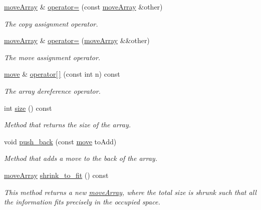 \begin{DoxyCompactItemize}
\mbox{\label{structmoveArray_ad7c5f1a65aab09aebbd565bb9cb4e75a}} 
\hyperlink{structmoveArray}{move\+Array} \& \hyperlink{structmoveArray_ad7c5f1a65aab09aebbd565bb9cb4e75a}{operator=} (const \hyperlink{structmoveArray}{move\+Array} \&other)
\begin{DoxyCompactList}\small\item\em The copy assignment operator. \end{DoxyCompactList}\item 
\mbox{\label{structmoveArray_ac52807be18bc0ed75496b11cedacb95c}} 
\hyperlink{structmoveArray}{move\+Array} \& \hyperlink{structmoveArray_ac52807be18bc0ed75496b11cedacb95c}{operator=} (\hyperlink{structmoveArray}{move\+Array} \&\&other)
\begin{DoxyCompactList}\small\item\em The move assignment operator. \end{DoxyCompactList}\item 
\mbox{\label{structmoveArray_a87f555217ae65d2cb0c3c86ea24685ba}} 
\hyperlink{structmove}{move} \& \hyperlink{structmoveArray_a87f555217ae65d2cb0c3c86ea24685ba}{operator\mbox{[}$\,$\mbox{]}} (const int n) const
\begin{DoxyCompactList}\small\item\em The array dereference operator. \end{DoxyCompactList}\item 
\mbox{\label{structmoveArray_a51d7076907d805b0ba70a70f73e3bf65}} 
int \hyperlink{structmoveArray_a51d7076907d805b0ba70a70f73e3bf65}{size} () const
\begin{DoxyCompactList}\small\item\em Method that returns the size of the array. \end{DoxyCompactList}\item 
\mbox{\label{structmoveArray_affee3c505faa6dc63cede89334cbfc7d}} 
void \hyperlink{structmoveArray_affee3c505faa6dc63cede89334cbfc7d}{push\+\_\+back} (const \hyperlink{structmove}{move} to\+Add)
\begin{DoxyCompactList}\small\item\em Method that adds a move to the back of the array. \end{DoxyCompactList}\item 
\mbox{\label{structmoveArray_a59c451aaecc1fddf97a92b886cf170f3}} 
\hyperlink{structmoveArray}{move\+Array} \hyperlink{structmoveArray_a59c451aaecc1fddf97a92b886cf170f3}{shrink\+\_\+to\+\_\+fit} () const
\begin{DoxyCompactList}\small\item\em This method returns a new \hyperlink{structmoveArray}{move\+Array}, where the total size is shrunk such that all the information fits precisely in the occupied space. \end{DoxyCompactList}\end{DoxyCompactItemize}
